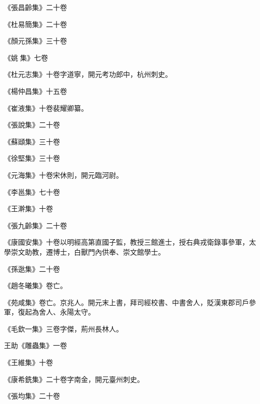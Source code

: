 \begin{pinyinscope}
 《張昌齡集》二十卷



 《杜易簡集》二十卷



 《顏元孫集》三十卷



 《姚集》七卷



 《杜元志集》十卷字道寧，開元考功郎中，杭州刺史。



 《楊仲昌集》十五卷



 《崔液集》十卷裴耀卿纂。



 《張說集》二十卷



 《蘇頲集》三十卷



 《徐堅集》三十卷



 《元海集》十卷宋休則，開元臨河尉。



 《李邕集》七十卷



 《王澣集》十卷



 《張九齡集》二十卷



 《康國安集》十卷以明經高第直國子監，教授三館進士，授右典戎衛錄事參軍，太學崇文助教，遷博士，白獸門內供奉、崇文館學士。



 《孫逖集》二十卷



 《趙冬曦集》卷亡。



 《苑咸集》卷亡。京兆人。開元末上書，拜司經校書、中書舍人，貶漢東郡司戶參軍，復起為舍人、永陽太守。



 《毛欽一集》三卷字傑，荊州長林人。



 王助《雕蟲集》一卷



 《王維集》十卷



 《康希銑集》二十卷字南金，開元臺州刺史。



 《張均集》二十卷




\end{pinyinscope}
